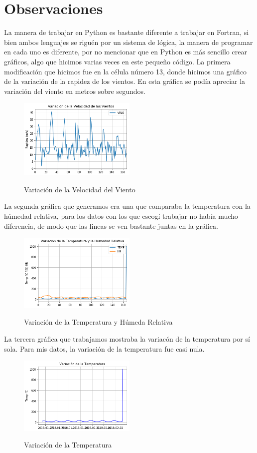 \documentclass{article}
\begin{document}
\section{Observaciones}
La manera de trabajar en Python es bastante diferente a trabajar en Fortran, si bien ambos lenguajes se riguén por un sistema de lógica, la manera de programar en cada uno es diferente, por no mencionar que en Python es más sencillo crear gráficos, algo que hicimos varias veces en este pequeño código.
La primera modificación que hicimos fue en la célula número 13, donde hicimos una gráfico de la variación de la rapidez de los vientos.
En esta gráfica se podía apreciar la variación del viento en metros sobre segundos.
\begin{figure}[H]
    \caption{Variación de la Velocidad del Viento}
    \includegraphics[width=0.5\textwidth]{Variacion VelViento.png}
    \centering
    \label{VeViento}
\end{figure}
La segunda gráfica que generamos era una que comparaba la temperatura con la húmedad relativa, para los datos con los que escogí trabajar no había mucho diferencia, de modo que las lineas se ven bastante juntas en la gráfica.
\begin{figure}[H]
    \caption{Variación de la Temperatura y Húmeda Relativa}
    \includegraphics[width=0.5\textwidth]{Variacion Tem-HumRel.png}
    \centering
    \label{TEMHUM}
\end{figure}
La tercera gráfica que trabajamos mostraba la variacón de la temperatura por sí sola. Para mis datos, la variación de la temperatura fue casi nula.
\begin{figure}[H]
    \caption{Variación de la Temperatura}
    \includegraphics[width=0.5\textwidth]{Variacion Temperatura.png}
    \centering
    \label{TEM}
\end{figure}
\end{document}
